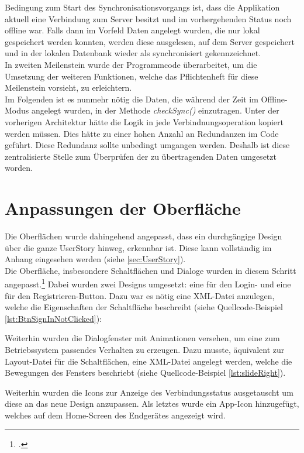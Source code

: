Bedingung zum Start des Synchronisationsvorgangs ist, dass die Applikation aktuell eine Verbindung zum Server besitzt und im vorhergehenden Status noch offline war. Falls dann im Vorfeld Daten angelegt wurden, die nur lokal gespeichert werden konnten, werden diese ausgelesen, auf dem Server gespeichert und in der lokalen Datenbank wieder als synchronisiert gekennzeichnet.\\
In zweiten Meilenstein wurde der Programmcode überarbeitet, um die Umsetzung der weiteren Funktionen, welche das Pflichtenheft für diese Meilenstein vorsieht, zu erleichtern. \\
Im Folgenden ist es nunmehr nötig die Daten, die während der Zeit im Offline-Modus angelegt wurden, in der Methode \textit{checkSync()} einzutragen. Unter der vorherigen Architektur hätte die Logik in jede Verbindnungsoperation kopiert werden müssen. Dies hätte zu einer hohen Anzahl an Redundanzen im Code geführt. Diese Redundanz sollte unbedingt umgangen werden. Deshalb ist diese zentralisierte Stelle zum Überprüfen der zu übertragenden Daten umgesetzt worden.
\section{Anpassungen der Oberfläche}
\label{sec:anpassungen-oberflaeche}
Die Oberflächen wurde dahingehend angepasst, dass ein durchgängige Design über die ganze \gls{UserStory} hinweg, erkennbar ist. Diese kann vollständig im Anhang eingesehen werden (siehe \ref{sec:UserStory}).\\ 
Die Oberfläche, insbesondere Schaltflächen und Dialoge wurden in diesem Schritt angepasst.\footcite{Android-Oberflaechen} Dabei wurden zwei Designs umgesetzt: eine für den Login- und eine für den Registrieren-Button. Dazu war es nötig eine \ac{XML}-Datei anzulegen, welche die Eigenschaften der Schaltfläche beschreibt (siehe Quellcode-Beispiel \ref{lst:BtnSignInNotClicked}):


Weiterhin wurden die Dialogfenster mit Animationen versehen, um eine zum Betriebssystem passendes Verhalten zu erzeugen. Dazu musste, äquivalent zur Layout-Datei für die Schaltflächen, eine \ac{XML}-Datei angelegt werden, welche die Bewegungen des Fensters beschriebt (siehe Quellcode-Beispiel \ref{lst:slideRight}).

Weiterhin wurden die Icons zur Anzeige des Verbindungsstatus ausgetauscht um diese an das neue Design anzupassen. Als letztes wurde ein App-Icon hinzugefügt, welches auf dem Home-Screen des Endgerätes angezeigt wird. 

